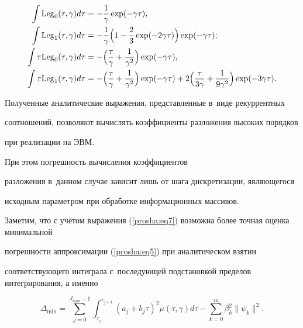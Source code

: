 \[

\begin{split}

 \int {\rm Leg}_0 ( \tau , \gamma  )d\tau  &=-\frac{1}{\gamma} \exp(-\gamma \tau ),\\

\int {\rm Leg}_1  ( \tau , \gamma  )d\tau  &=-\frac{1}{\gamma}\Bigl( 1-\frac23\exp(-2\gamma \tau )  \Bigr) \exp(-\gamma \tau );\\

\int \tau {\rm Leg}_0  ( \tau , \gamma  )d\tau  &=- \Bigl( \frac{\tau }{\gamma }+\frac{1}{\gamma ^2}  \Bigr)\exp(-\gamma \tau),\\

\int \tau {\rm Leg}_1  ( \tau , \gamma  )d\tau  &=-\Bigl( \frac{\tau }{\gamma }+\frac{1}{\gamma ^2}  \Bigr)\exp(-\gamma\tau )+2\Bigl(\frac{\tau }{3\gamma }+\frac{1}{9\gamma ^2}  \Bigr)\exp(-3\gamma \tau)

.

\end{split}

\]







Полученные аналитические выражения, представленные в~виде рекуррентных

соотношений, позволяют вычислять коэффициенты разложения высоких порядков

при реализации на ЭВМ.

При этом погрешность вычисления коэффициентов

разложения в~данном случае зависит лишь от шага дискретизации, являющегося

исходным параметром при обработке информационных массивов.



Заметим, что с учётом выражения (\ref{prosha:eq7}) возможна более точная оценка минимальной

погрешности аппроксимации (\ref{prosha:eq5}) при аналитическом взятии

соответствующего интеграла с~последующей подстановкой пределов интегрирования, а именно

\[

\Delta _{\min } =\sum\limits_{j=0}^{J_{\max } -1}

\int_{\tau _j}^{\tau _{j+1} }   ( a_j +b_j \tau )^2\mu  (\tau , \gamma)d\tau -

\sum\limits_{k=0}^m \beta _k^2  \| \psi _k  \|^2 .

\]





